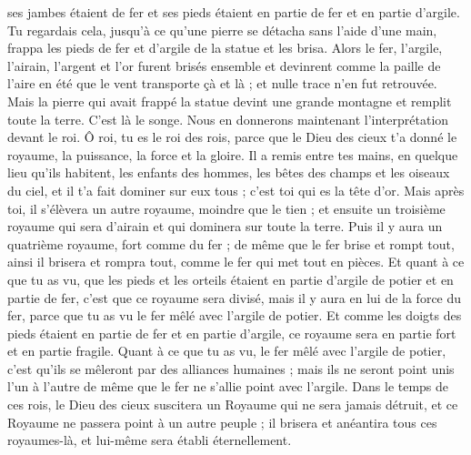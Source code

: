 \begin{multicols}{2}
ses jambes étaient de fer et ses pieds étaient en partie de fer et en partie d'argile.
Tu regardais cela, jusqu'à ce qu'une pierre se détacha sans l'aide d'une main, frappa les pieds de fer et d'argile de la statue et les brisa.
Alors le fer, l'argile, l'airain, l'argent et l'or furent brisés ensemble et devinrent comme la paille de l'aire en été que le vent transporte çà et là ; et nulle trace n'en fut retrouvée. Mais la pierre qui avait frappé la statue devint une grande montagne et remplit toute la terre.
C'est là le songe. Nous en donnerons maintenant l'interprétation devant le roi.
Ô roi, tu es le roi des rois, parce que le Dieu des cieux t'a donné le royaume, la puissance, la force et la gloire.
Il a remis entre tes mains, en quelque lieu qu'ils habitent, les enfants des hommes, les bêtes des champs et les oiseaux du ciel, et il t'a fait dominer sur eux tous ; c'est toi qui es la tête d'or.
Mais après toi, il s'élèvera un autre royaume, moindre que le tien ; et ensuite un troisième royaume qui sera d'airain et qui dominera sur toute la terre.
Puis il y aura un quatrième royaume, fort comme du fer ; de même que le fer brise et rompt tout, ainsi il brisera et rompra tout, comme le fer qui met tout en pièces.
Et quant à ce que tu as vu, que les pieds et les orteils étaient en partie d'argile de potier et en partie de fer, c'est que ce royaume sera divisé, mais il y aura en lui de la force du fer, parce que tu as vu le fer mêlé avec l'argile de potier.
Et comme les doigts des pieds étaient en partie de fer et en partie d'argile, ce royaume sera en partie fort et en partie fragile.
 Quant à ce que tu as vu, le fer mêlé avec l'argile de potier, c'est qu'ils se mêleront par des alliances humaines ; mais ils ne seront point unis l'un à l'autre de même que le fer ne s'allie point avec l'argile.
Dans le temps de ces rois, le Dieu des cieux suscitera un Royaume qui ne sera jamais détruit, et ce Royaume ne passera point à un autre peuple ; il brisera et anéantira tous ces royaumes-là, et lui-même sera établi éternellement.

\end{multicols}
